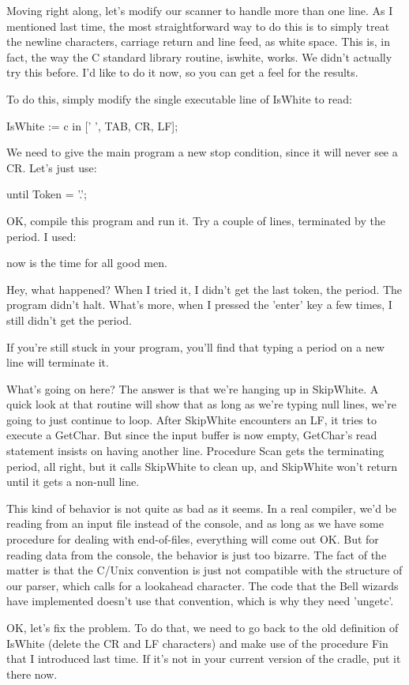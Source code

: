 \documentclass[float=false, crop=false]{standalone}
\begin{document}
Moving right along, let's modify our scanner to handle more than one line. As I
mentioned last time, the most straightforward way to do this is to simply treat
the newline characters, carriage return and line feed, as white space. This is,
in fact, the way the C standard library routine, iswhite, works. We didn't
actually try this before. I'd like to do it now, so you can get a feel for the
results.

To do this, simply modify the single executable line of IsWhite to read:


   IsWhite := c in [' ', TAB, CR, LF];


We need to give the main program a new stop condition, since it will never see a
CR. Let's just use:


   until Token = '.';


OK, compile this program and run it. Try a couple of lines, terminated by the
period. I used:


     now is the time
     for all good men.

Hey, what happened? When I tried it, I didn't get the last token, the period.
The program didn't halt. What's more, when I pressed the 'enter' key a few
times, I still didn't get the period.

If you're still stuck in your program, you'll find that typing a period on a new
line will terminate it.

What's going on here? The answer is that we're hanging up in SkipWhite. A quick
look at that routine will show that as long as we're typing null lines, we're
going to just continue to loop. After SkipWhite encounters an LF, it tries to
execute a GetChar. But since the input buffer is now empty, GetChar's read
statement insists on having another line. Procedure Scan gets the terminating
period, all right, but it calls SkipWhite to clean up, and SkipWhite won't
return until it gets a non-null line.

This kind of behavior is not quite as bad as it seems. In a real compiler, we'd
be reading from an input file instead of the console, and as long as we have
some procedure for dealing with end-of-files, everything will come out OK. But
for reading data from the console, the behavior is just too bizarre. The fact of
the matter is that the C/Unix convention is just not compatible with the
structure of our parser, which calls for a lookahead character. The code that
the Bell wizards have implemented doesn't use that convention, which is why they
need 'ungetc'.

OK, let's fix the problem. To do that, we need to go back to the old definition
of IsWhite (delete the CR and LF characters) and make use of the procedure Fin
that I introduced last time. If it's not in your current version of the cradle,
put it there now.
\end{document}
